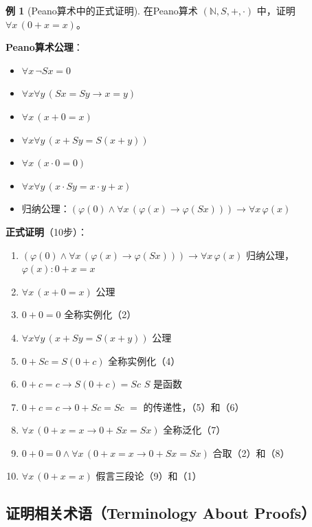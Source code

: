 \documentclass[UTF8,11pt,a4paper]{ctexbook}   %
\theoremstyle{definition}
\newtheorem{example}{例}[section]
\begin{document}
\begin{example}[Peano算术中的正式证明]
在Peano算术 $(\mathbb{N}, S, +, \cdot)$ 中，证明 $\forall x\,(0 + x = x)$。

\textbf{Peano算术公理}：
\begin{itemize}
    \item $\forall x\,\neg Sx = 0$
    \item $\forall x\forall y\,(Sx = Sy \to x = y)$
    \item $\forall x\,(x + 0 = x)$
    \item $\forall x\forall y\,(x + Sy = S(x + y))$
    \item $\forall x\,(x \cdot 0 = 0)$
    \item $\forall x\forall y\,(x \cdot Sy = x \cdot y + x)$
    \item 归纳公理：$(\varphi(0) \land \forall x\,(\varphi(x) \to \varphi(Sx))) \to \forall x\,\varphi(x)$
\end{itemize}

\textbf{正式证明}（10步）：
\begin{enumerate}
    \item $(\varphi(0) \land \forall x\,(\varphi(x) \to \varphi(Sx))) \to \forall x\,\varphi(x)$ \hfill 归纳公理，$\varphi(x): 0+x=x$
    \item $\forall x\,(x + 0 = x)$ \hfill 公理
    \item $0 + 0 = 0$ \hfill 全称实例化（2）
    \item $\forall x\forall y\,(x + Sy = S(x + y))$ \hfill 公理
    \item $0 + Sc = S(0 + c)$ \hfill 全称实例化（4）
    \item $0 + c = c \to S(0 + c) = Sc$ \hfill $S$ 是函数
    \item $0 + c = c \to 0 + Sc = Sc$ \hfill $=$ 的传递性，（5）和（6）
    \item $\forall x\,(0 + x = x \to 0 + Sx = Sx)$ \hfill 全称泛化（7）
    \item $0 + 0 = 0 \land \forall x\,(0 + x = x \to 0 + Sx = Sx)$ \hfill 合取（2）和（8）
    \item $\forall x\,(0 + x = x)$ \hfill 假言三段论（9）和（1）
\end{enumerate}
\end{example}

\subsection{证明相关术语（Terminology About Proofs）}
\end{document}

